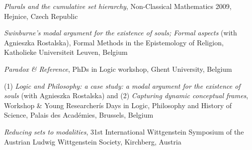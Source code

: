 \documentclass[10pt, a4paper]{article}
\newcommand{\years}[1]{\marginnote{\normalsize #1}}
\begin{document}
 \emph{Plurals and the cumulative set hierarchy},   Non-Classical Mathematics 2009,    Hejnice, Czech Republic


\vspace{0.5mm}


\emph{Swinburne's modal argument for the existence of souls; Formal aspects} (with Agnieszka Rostalska),  Formal Methods in the Epistemology of Religion,   Katholieke Universiteit Leuven, Belgium


\vspace{0.5mm}




  \emph{Paradox \& Reference},   PhDs in Logic workshop,    Ghent University, Belgium


\vspace{0.5mm}





(1) \emph{Logic and Philosophy: a case study: a modal argument for the existence of souls}  (with Agnieszka  Rostalska) and (2) \emph{Capturing dynamic conceptual frames}, Workshop \& Young Researcherís Days in Logic, Philosophy and History of Science,  Palais des Acad\'emies, Brussels, Belgium






\vspace{0.5mm}


 \emph{Reducing sets to modalities}, 31st  International \mbox{Wittgenstein} Symposium of the Austrian Ludwig \mbox{Wittgenstein} Society,  Kirchberg, Austria



\vspace{0.5mm}





\end{document}
